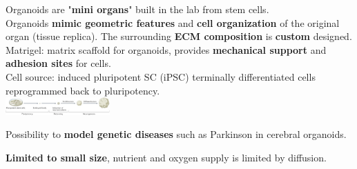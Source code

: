 Organoids are "\textbf{mini organs}" built in the lab from stem cells.\\
Organoids \textbf{mimic geometric features} and \textbf{cell organization} of the original organ (tissue replica). The surrounding \textbf{ECM composition} is \textbf{custom} designed.\\

Matrigel: matrix scaffold for organoids, provides \textbf{mechanical support} and \textbf{adhesion sites} for cells.\\
Cell source: induced pluripotent SC (iPSC) terminally differentiated cells reprogrammed back to pluripotency.\\

\includegraphics[width=40mm]{src/Images/organoid.png}


Possibility to \textbf{model genetic diseases} such as Parkinson in cerebral organoids.

\textbf{Limited to small size}, nutrient and oxygen supply is limited by diffusion.\\